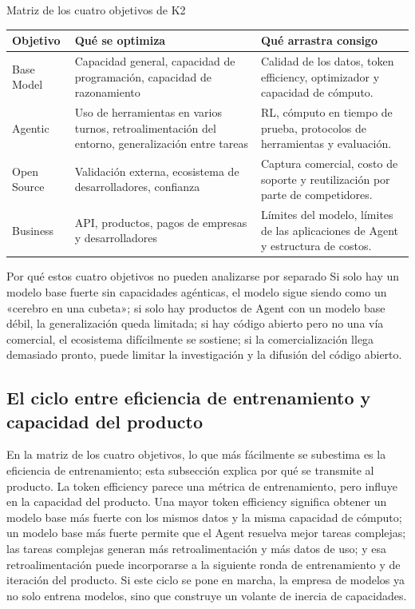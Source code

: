 \documentclass[a4paper]{article}
\begin{document}
\begin{knowledgebox}{Matriz de los cuatro objetivos de K2}
\begin{tabularx}{\textwidth}{p{}p{}p{}}
\toprule
Objetivo & Qué se optimiza & Qué arrastra consigo \\
\midrule
Base Model & Capacidad general, capacidad de programación, capacidad de razonamiento & Calidad de los datos, token efficiency, optimizador y capacidad de cómputo. \\
Agentic & Uso de herramientas en varios turnos, retroalimentación del entorno, generalización entre tareas & RL, cómputo en tiempo de prueba, protocolos de herramientas y evaluación. \\
Open Source & Validación externa, ecosistema de desarrolladores, confianza & Captura comercial, costo de soporte y reutilización por parte de competidores. \\
Business & API, productos, pagos de empresas y desarrolladores & Límites del modelo, límites de las aplicaciones de Agent y estructura de costos. \\
\bottomrule
\end{tabularx}
\end{knowledgebox}

\begin{importantbox}{Por qué estos cuatro objetivos no pueden analizarse por separado}
Si solo hay un modelo base fuerte sin capacidades agénticas, el modelo sigue siendo como un «cerebro en una cubeta»; si solo hay productos de Agent con un modelo base débil, la generalización queda limitada; si hay código abierto pero no una vía comercial, el ecosistema difícilmente se sostiene; si la comercialización llega demasiado pronto, puede limitar la investigación y la difusión del código abierto.
\end{importantbox}

\subsection{El ciclo entre eficiencia de entrenamiento y capacidad del producto}

En la matriz de los cuatro objetivos, lo que más fácilmente se subestima es la eficiencia de entrenamiento; esta subsección explica por qué se transmite al producto. La token efficiency parece una métrica de entrenamiento, pero influye en la capacidad del producto. Una mayor token efficiency significa obtener un modelo base más fuerte con los mismos datos y la misma capacidad de cómputo; un modelo base más fuerte permite que el Agent resuelva mejor tareas complejas; las tareas complejas generan más retroalimentación y más datos de uso; y esa retroalimentación puede incorporarse a la siguiente ronda de entrenamiento y de iteración del producto. Si este ciclo se pone en marcha, la empresa de modelos ya no solo entrena modelos, sino que construye un volante de inercia de capacidades.
\end{document}
